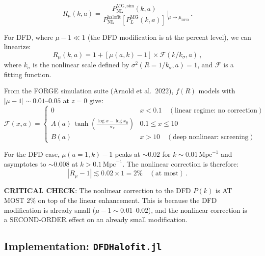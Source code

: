\documentclass[11pt,a4paper]{article}
\begin{document}
\begin{equation}
R_\mu(k,a) = \frac{P_{\mathrm{NL}}^{\mathrm{MG,sim}}(k,a)}{P_{\mathrm{NL}}^{\mathrm{halofit}}[P_L^{\mathrm{MG}}(k,a)]}\bigg|_{\mu \to \mu_{\mathrm{DFD}}}\,.
\end{equation}

For DFD, where $\mu - 1 \ll 1$ (the DFD modification is at the percent level), we can linearize:
\begin{equation}
R_\mu(k,a) = 1 + [\mu(a,k) - 1] \times \mathcal{F}(k/k_\sigma, a)\,,
\end{equation}
where $k_\sigma$ is the nonlinear scale defined by $\sigma^2(R = 1/k_\sigma, a) = 1$, and $\mathcal{F}$ is a fitting function.

From the FORGE simulation suite (Arnold et al.\ 2022), $f(R)$ models with $|\mu - 1| \sim 0.01$--$0.05$ at $z = 0$ give:
\begin{equation}
\mathcal{F}(x,a) = \begin{cases}
0 & x < 0.1\quad(\text{linear regime: no correction}) \\
A(a)\,\tanh\left(\frac{\log x - \log x_0}{\sigma_x}\right) & 0.1 \leq x \leq 10 \\
B(a) & x > 10\quad(\text{deep nonlinear: screening})
\end{cases}
\end{equation}

For the DFD case, $\mu(a=1,k) - 1$ peaks at $\sim 0.02$ for $k \sim 0.01\,\mathrm{Mpc}^{-1}$ and asymptotes to $\sim 0.008$ at $k > 0.1\,\mathrm{Mpc}^{-1}$. The nonlinear correction is therefore:
\begin{equation}
|R_\mu - 1| \lesssim 0.02 \times 1 = 2\%\quad(\text{at most})\,.
\end{equation}

\textbf{CRITICAL CHECK}: The nonlinear correction to the DFD $P(k)$ is AT MOST 2\% on top of the linear enhancement. This is because the DFD modification is already small ($\mu - 1 \sim 0.01$--$0.02$), and the nonlinear correction is a SECOND-ORDER effect on an already small modification.

\subsection{Implementation: \texttt{DFDHalofit.jl}}
\end{document}
